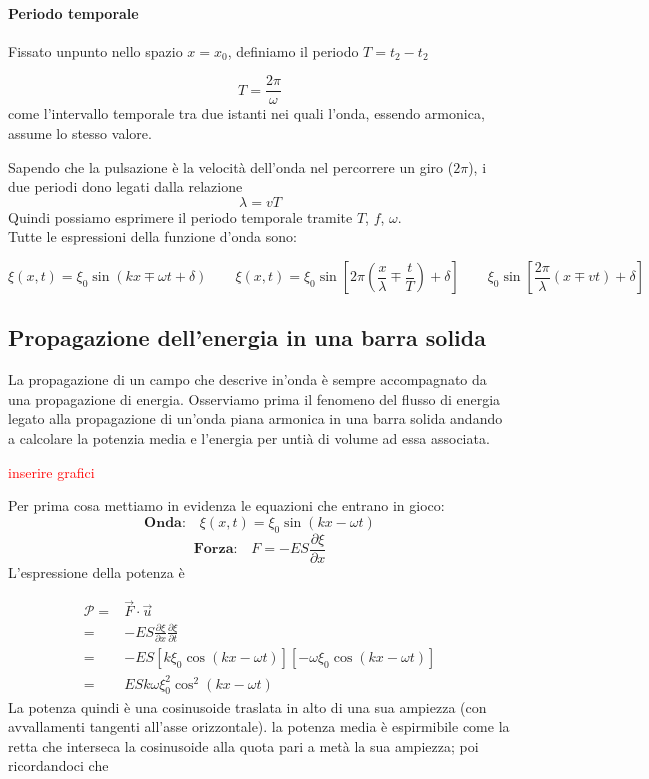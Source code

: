 \documentclass[x11names]{article}
\begin{document}
\paragraph{Periodo temporale} Fissato unpunto nello spazio \(x=x_0\), definiamo il periodo \(T = t_2-t_2\)

\[ T = \frac{2\pi}{\omega}\] 
come l'intervallo temporale tra due istanti nei quali l'onda, essendo armonica, assume lo stesso valore.

Sapendo che la pulsazione è la velocità dell'onda nel percorrere un giro (\(2\pi\)), i due periodi dono legati dalla relazione
\[ 
\lambda = vT
\]
Quindi possiamo esprimere il periodo temporale tramite \(T\), \(f\), \(\omega\).\\

\noindent
Tutte le espressioni della funzione d'onda sono:

\[ 
\xi(x,t) = \xi_0 \sin\left(kx \mp \omega t + \delta\right) \qquad \xi(x,t) = \xi_0 \sin\left[ 2\pi\left(\frac{x}{\lambda} \mp \frac{t}{T}\right) + \delta\right]  \qquad \xi_0\sin\left[\frac{2\pi}{\lambda}\left(x \mp vt\right) + \delta \right]
\]
	
	
	\newpage
	\subsection{Propagazione dell'energia in una barra solida}
	La propagazione di un campo che descrive in'onda è sempre accompagnato da una propagazione di energia. Osserviamo prima il fenomeno del flusso di energia legato alla propagazione di un'onda piana armonica in una barra solida andando a calcolare la potenzia media e l'energia per untià di volume ad essa associata.\\
	
	\begin{center}
		\textcolor{red}{inserire grafici}
	\end{center}
	
	\noindent
	Per prima cosa mettiamo in evidenza le equazioni che entrano in gioco:
	\[ 
	\textbf{Onda:} \quad \xi(x,t) = \xi_0\sin\left(kx - \omega t\right)
	\]
	\[ 
	\textbf{Forza:} \quad F = -ES\frac{\partial\xi}{\partial x}
	\]
	L'espressione della potenza è 
	
	\begin{align*}
		\mathcal{P} =& \vec{F} \cdot \vec{u} \\
					=& -ES\frac{\partial\xi}{\partial x}\frac{\partial\xi}{\partial t} \\
					=& -ES\left[k\xi_0\cos\left(kx -\omega t\right)\right]\left[-\omega \xi_0\cos\left(kx -\omega t\right)\right] \\
					=& ESk\omega \xi_0^2\cos^2\left(kx-\omega t\right)
	\end{align*}
	La potenza quindi è una cosinusoide traslata in alto di una sua ampiezza (con avvallamenti tangenti all'asse orizzontale). la potenza media è espirmibile come la retta che interseca la cosinusoide alla quota pari a metà la sua ampiezza; poi ricordandoci che
	
\end{document}
